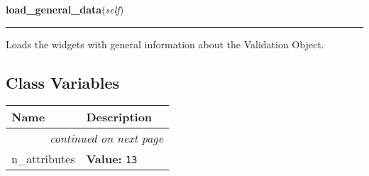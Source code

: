     \label{reliafree:validation:Validation:load_general_data}

    \vspace{0.5ex}

\hspace{.8\funcindent}\begin{boxedminipage}{\funcwidth}

    \raggedright \textbf{load\_general\_data}(\textit{self})

    \vspace{-1.5ex}

    \rule{\textwidth}{0.5\fboxrule}
\setlength{\parskip}{2ex}
    Loads the widgets with general information about the Validation Object.

\setlength{\parskip}{1ex}
    \end{boxedminipage}



  \subsection{Class Variables}

    \vspace{-1cm}
\hspace{\varindent}\begin{longtable}{|p{\varnamewidth}|p{\vardescrwidth}|l}
\cline{1-2}
\cline{1-2} \centering \textbf{Name} & \centering \textbf{Description}& \\
\cline{1-2}
\endhead\cline{1-2}\multicolumn{3}{r}{\small\textit{continued on next page}}\\\endfoot\cline{1-2}
\endlastfoot\raggedright n\-\_\-a\-t\-t\-r\-i\-b\-u\-t\-e\-s\- & \raggedright \textbf{Value:} 
{\tt 13}&\\
\cline{1-2}
\end{longtable}

